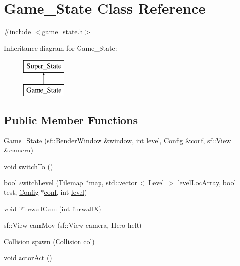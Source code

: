 \hypertarget{class_game___state}{}\section{Game\+\_\+\+State Class Reference}
\label{class_game___state}


{\ttfamily \#include $<$game\+\_\+state.\+h$>$}

Inheritance diagram for Game\+\_\+\+State\+:\begin{figure}[H]
\begin{center}
\leavevmode
\includegraphics[height=2.000000cm]{class_game___state}
\end{center}
\end{figure}
\subsection*{Public Member Functions}
\begin{DoxyCompactItemize}
\item 
\hyperlink{class_game___state_a93409470dc62892876fe0dafafb910ad}{Game\+\_\+\+State} (sf\+::\+Render\+Window \&\hyperlink{class_game___state_a5a9bb4b732ee25b0f9de3baa2ee71045}{window}, int \hyperlink{class_super___state_ad6b74d4864a4e2cccf58316cd1af2e83}{level}, \hyperlink{class_config}{Config} \&\hyperlink{class_game___state_a6f82c6c66962953aee7de556d3877eeb}{conf}, sf\+::\+View \&camera)
\item 
void \hyperlink{class_game___state_aaaaa14909458922108ecc2495986db3d}{switch\+To} ()
\item 
bool \hyperlink{class_game___state_acf99f3862148f13c48e9644b7bd5e64b}{switch\+Level} (\hyperlink{class_tilemap}{Tilemap} $\ast$\hyperlink{class_game___state_af09e995b6bf08cbc23ef6dc4b32ad5cd}{map}, std\+::vector$<$ \hyperlink{class_level}{Level} $>$ level\+Loc\+Array, bool test, \hyperlink{class_config}{Config} $\ast$\hyperlink{class_game___state_a6f82c6c66962953aee7de556d3877eeb}{conf}, int \hyperlink{class_super___state_ad6b74d4864a4e2cccf58316cd1af2e83}{level})
\item 
void \hyperlink{class_game___state_a122037a320f91a566d07697ea4fa0f39}{Firewall\+Cam} (int firewallX)
\item 
sf\+::\+View \hyperlink{class_game___state_a87ce59fa6d8147096bfb835c5a93fc1d}{cam\+Mov} (sf\+::\+View camera, \hyperlink{class_hero}{Hero} helt)
\item 
\hyperlink{class_collision}{Collision} \hyperlink{class_game___state_a828b93b20d67bb6bdb1d15cd538157f5}{spawn} (\hyperlink{class_collision}{Collision} col)
\item 
void \hyperlink{class_game___state_a8dad75e154735be07e6d8d257bda049f}{actor\+Act} ()
\end{DoxyCompactItemize}
